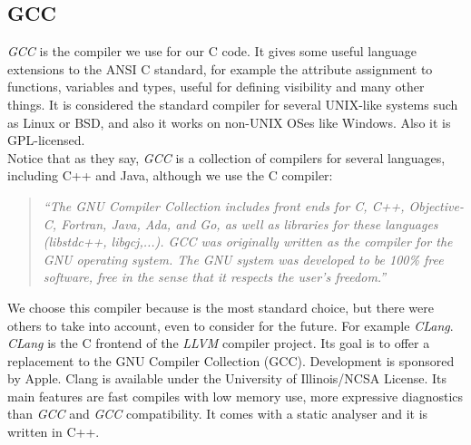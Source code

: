 \subsection{GCC}
\emph{GCC} is the compiler we use for our C code. It gives some useful language extensions to the ANSI C standard\cite{gnu:cext}, for 
example
the attribute assignment to functions, variables and types, useful for defining visibility and many other things. It is considered the
standard compiler for several UNIX-like systems such as Linux or BSD, and also it works on non-UNIX OSes like Windows. Also it is 
GPL-licensed.\\
Notice that as they say, \emph{GCC} is a collection of compilers for several languages, including C++ and Java, although we use the C 
compiler\cite{gnu:gcc}:
\begin{quote}
  \emph{``The GNU Compiler Collection includes front ends for C, C++, Objective-C, Fortran, Java, Ada, and Go, as well as libraries for 
	  these languages (libstdc++, libgcj,...). GCC was originally written as the compiler for the GNU operating system. The GNU system
	  was developed to be 100\% free software, free in the sense that it respects the user's freedom.''}
\end{quote}
We choose this compiler because is the most standard choice, but there were others to take into account, even to consider for the 
future. For example \emph{CLang}.\\
\emph{CLang} is the C frontend of the \emph{LLVM} compiler project. Its goal is to offer a replacement to 
the GNU Compiler Collection (GCC). Development is sponsored by Apple. Clang is available under the University of Illinois/NCSA License. 
Its main features are fast compiles with low memory use, more expressive diagnostics than \emph{GCC} and \emph{GCC} compatibility. It comes
with a static analyser and it is written in C++.
